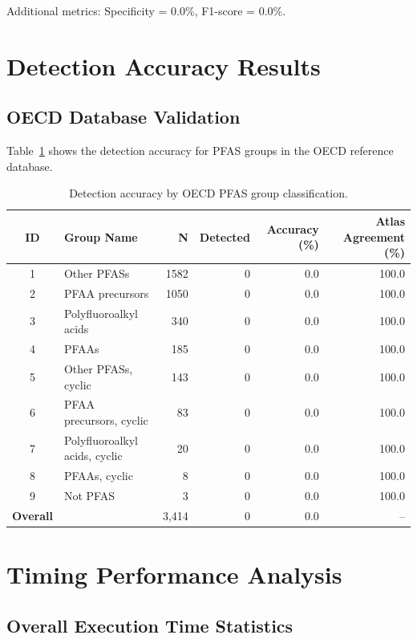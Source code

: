 Additional metrics: Specificity = 0.0\%, F1-score = 0.0\%.

\section*{Detection Accuracy Results}

\subsection*{OECD Database Validation}

Table~\ref{tab:oecd_accuracy} shows the detection accuracy for PFAS groups in the OECD reference database.

\begin{table}[htbp]
\centering
\caption{Detection accuracy by OECD PFAS group classification.}
\label{tab:oecd_accuracy}
\begin{tabular}{clrrrr}
\toprule
\textbf{ID} & \textbf{Group Name} & \textbf{N} & \textbf{Detected} & \textbf{Accuracy (\%)} & \textbf{Atlas Agreement (\%)} \\
\midrule
1 & Other PFASs & 1582 & 0 & 0.0 & 100.0 \\
2 & PFAA precursors & 1050 & 0 & 0.0 & 100.0 \\
3 & Polyfluoroalkyl acids & 340 & 0 & 0.0 & 100.0 \\
4 & PFAAs & 185 & 0 & 0.0 & 100.0 \\
5 & Other PFASs, cyclic & 143 & 0 & 0.0 & 100.0 \\
6 & PFAA precursors, cyclic & 83 & 0 & 0.0 & 100.0 \\
7 & Polyfluoroalkyl acids, cyclic & 20 & 0 & 0.0 & 100.0 \\
8 & PFAAs, cyclic & 8 & 0 & 0.0 & 100.0 \\
9 & Not PFAS & 3 & 0 & 0.0 & 100.0 \\
\midrule
\textbf{Overall} & & 3,414 & 0 & 0.0 & -- \\
\bottomrule
\end{tabular}
\end{table}

\section*{Timing Performance Analysis}

\subsection*{Overall Execution Time Statistics}


